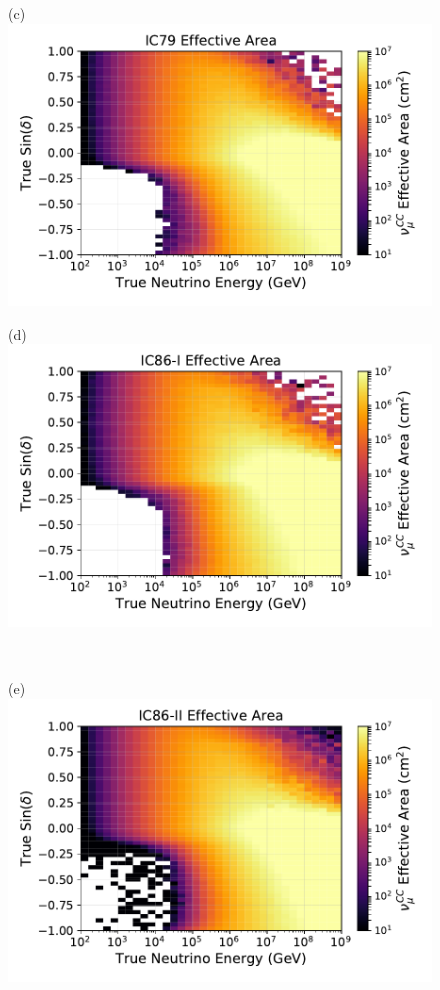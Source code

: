 \documentclass[aps,10pt,prd,twocolumn,floats,letterpaper,showpacs,nofootinbib,bibnotes,notitlepage,superscriptaddress,floatfix]{revtex4-1}
\begin{document}
\begin{figure}[t]
\begin{minipage}[c][6.5cm][c]{0.49\textwidth}
{(c)}\\\includegraphics[width=\linewidth]{./PublicReleasePlots/EffectiveAreaPlots/IC79_effectiveArea.pdf}
\end{minipage}
\begin{minipage}[c][6.5cm][c]{0.49\textwidth}\centering
{(d)}\\\includegraphics[width=\linewidth]{./PublicReleasePlots/EffectiveAreaPlots/IC86_I_effectiveArea.pdf}
\end{minipage}\\
\begin{minipage}[c][6.5cm][c]{0.49\textwidth}\centering
{(e)}\\\includegraphics[width=\linewidth]{./PublicReleasePlots/EffectiveAreaPlots/IC86_II_effectiveArea.pdf}

\end{minipage}
\end{figure}
\end{document}
